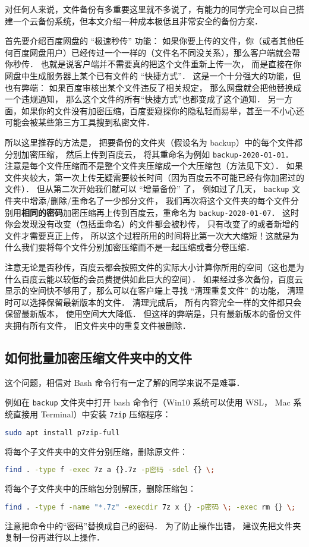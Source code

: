 
对任何人来说，文件备份有多重要这里就不多说了，有能力的同学完全可以自己搭建一个云备份系统，但本文介绍一种成本极低且非常安全的备份方案．

首先要介绍百度网盘的 “极速秒传” 功能： 如果你要上传的文件，你（或者其他任何百度网盘用户）已经传过一个一样的（文件名不同没关系），那么客户端就会帮你秒传． 也就是说客户端并不需要真的把这个文件重新上传一次， 而是直接在你网盘中生成服务器上某个已有文件的 “快捷方式”． 这是一个十分强大的功能，但也有弊端： 如果百度审核出某个文件违反了相关规定， 那么网盘就会把他替换成一个违规通知， 那么这个文件的所有“快捷方式”也都变成了这个通知． 另一方面，如果你的文件没有加密压缩，百度要窥探你的隐私轻而易举，甚至一不小心还可能会被某些第三方工具搜到私密文件．

所以这里推荐的方法是， 把要备份的文件夹（假设名为 backup）中的每个文件都分别加密压缩， 然后上传到百度云， 将其重命名为例如 \verb|backup-2020-01-01|． 注意是每个文件压缩而不是整个文件夹压缩成一个大压缩包（方法见下文）． 如果文件夹较大，第一次上传无疑需要较长时间（因为百度云不可能已经有你加密过的文件）． 但从第二次开始我们就可以 “增量备份” 了， 例如过了几天， \verb|backup| 文件夹中增添/删除/重命名了一少部分文件， 我们再次将这个文件夹的每个文件分别用\textbf{相同的密码}加密压缩再上传到百度云，重命名为 \verb|backup-2020-01-07|． 这时你会发现没有改变（包括重命名）的文件都会被秒传， 只有改变了的或者新增的文件才需要真正上传， 所以这个过程所用的时间将比第一次大大缩短！这就是为什么我们要将每个文件分别加密压缩而不是一起压缩或者分卷压缩．

注意无论是否秒传，百度云都会按照文件的实际大小计算你所用的空间（这也是为什么百度云能以较低的会员费提供如此巨大的空间）． 如果经过多次备份，百度云显示的空间快不够用了，那么可以在客户端上寻找 “清理重复文件” 的功能， 清理时可以选择保留最新版本的文件． 清理完成后， 所有内容完全一样的文件都只会保留最新版本， 使用空间大大降低． 但这样的弊端是，只有最新版本的备份文件夹拥有所有文件， 旧文件夹中的重复文件被删除．

\subsection{如何批量加密压缩文件夹中的文件}

这个问题，相信对 Bash 命令行有一定了解的同学来说不是难事．

例如在 \verb|backup| 文件夹中打开 bash 命令行（Win10 系统可以使用 WSL， Mac 系统直接用 Terminal）中安装 \verb|7zip| 压缩程序：
\begin{lstlisting}[language=bash]
sudo apt install p7zip-full
\end{lstlisting}
将每个子文件夹中的文件分别压缩，删除原文件：
\begin{lstlisting}[language=bash]
find . -type f -exec 7z a {}.7z -p密码 -sdel {} \;
\end{lstlisting}
将每个子文件夹中的压缩包分别解压，删除压缩包：
\begin{lstlisting}[language=bash]
find . -type f -name "*.7z" -execdir 7z x {} -p密码 \; -exec rm {} \;
\end{lstlisting}
注意把命令中的“密码”替换成自己的密码． 为了防止操作出错， 建议先把文件夹复制一份再进行以上操作．
